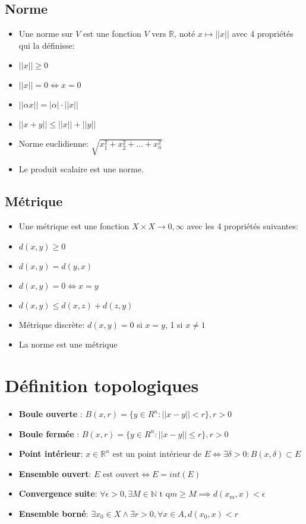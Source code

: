 \documentclass[12pt]{book}
\let\Bbb\mathbb
\theoremstyle{definition}
\begin{document}
\subsection{Norme}
\begin{itemize}
    \item Une norme sur $V$ est une fonction $V$ vers $\Bbb R$, noté $x \mapsto ||x||$ avec 4 propriétés qui la définisse:
    \item $||x|| \geq 0$
    \item $||x|| = 0 \iff x = 0$
    \item $||\alpha x|| = |\alpha| \cdot ||x||$
    \item $||x + y || \leq ||x|| + ||y||$
    \item Norme euclidienne: $\sqrt{x_1^2 + x_2^2 + \dots + x_n^2}$
    \item Le produit scalaire est une norme.
\end{itemize}
\subsection{Métrique}
\begin{itemize}
    \item Une métrique est une fonction $X \times X \to 0, \infty$ avec les 4 propriétés suivantes:
    \item $d(x,y) \geq 0$
    \item $d(x,y) = d(y, x)$
    \item $d(x,y) = 0 \iff x = y$
    \item $d(x,y) \leq d(x, z) + d(z, y)$
    \item Métrique discrète: $d(x,y) = 0$ si $x = y$, 1 si $x \neq 1$
    \item La norme est une métrique
\end{itemize}
\section{Définition topologiques}
\begin{itemize}
    \item \textbf{Boule ouverte} : $B(x, r) = \{y \in R^n : || x - y || < r\}, r > 0$
    \item \textbf{Boule fermée} : $B(x, r) = \{y \in R^n : || x - y || \leq r\}, r > 0$
    \item \textbf{Point intérieur}: $x \in \Bbb R^n \text{ est un point intérieur de } E \iff \exists \delta > 0 : B(x, \delta) \subset E$
    \item \textbf{Ensemble ouvert}: $E\text{ est ouvert} \iff E = int(E)$
    \item \textbf{Convergence suite}: $\forall \epsilon > 0, \exists M \in \Bbb N \text{ t q} m \geq M \implies d(x_m, x) < \epsilon$
    \item \textbf{Ensemble borné}: $\exists x_0 \in X \land \exists r > 0, \forall x \in A, d(x_0, x) < r$
\end{itemize}
\end{document}
